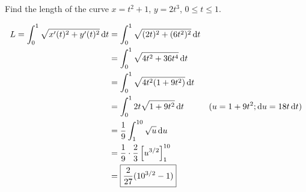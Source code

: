 \documentclass[12pt,answers]{exam}
\begin{document}
\begin{questions}
\newpage
\question[8]
Find the length of the curve $x = t^2 + 1$, $y = 2t^3$, $0 \le t \le 1$.
\begin{solution}
    \begin{align*}
        L = \int_0^1 \sqrt{x'(t)^2 + y'(t)^2} \dif t
        &= \int_0^1 \sqrt{(2t)^2 + (6t^2)^2} \dif t \\ 
        &= \int_0^1 \sqrt{4t^2 + 36 t^4} \dif t \\ 
        &= \int_0^1 \sqrt{4t^2(1+9t^2)}  \dif t \\ 
        &= \int_0^1 2t \sqrt{1+9t^2} \dif t  & (u = 1+9t^2; \dif u = 18t \dif t)\\ 
        &= \frac 19 \int_1^{10} \sqrt u \dif u \\ 
        &= \frac19 \cdot \frac 23 \left[ u^{3/2}\right]_1^{10} \\ 
        &= \boxed{\frac{2}{27} (10^{3/2} - 1)}
    \end{align*}
\end{solution}

\newpage
\question
{}
\end{questions}
\end{document}
